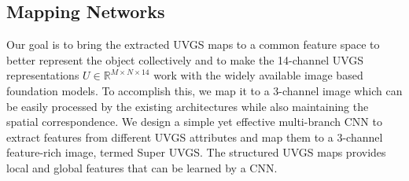 



\vspace{-0.1cm}
\subsection{Mapping Networks}\label{ssec:mapping}
Our goal is to bring the extracted UVGS maps to a common feature space to better represent the object collectively and to make the 14-channel UVGS representations $U \in \mathbb{R}^{M\times N \times14}$ work with the widely available image based foundation models. To accomplish this, we map it to a 3-channel image which can be easily processed by the existing architectures while also maintaining the spatial correspondence. 
%
%
We design a simple yet effective multi-branch CNN to extract features from different UVGS attributes and map them to a 3-channel feature-rich image, termed Super UVGS. The structured UVGS maps provides local and global features that can be learned by a CNN.

